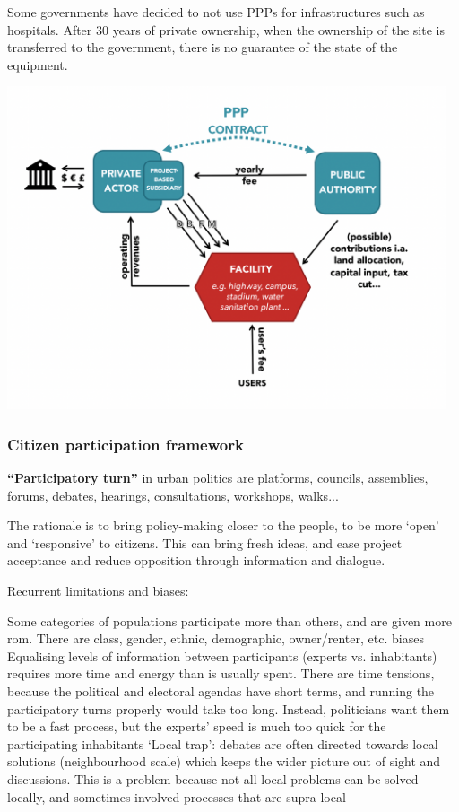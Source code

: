 \documentclass{article}
\begin{document}
Some governments have decided to not use PPPs for infrastructures such as hospitals. After 30 years of private ownership, when the ownership of the site is transferred to the government, there is no guarantee of the state of the equipment.

\begin{center}
\includegraphics[width=35em]{public_private_partnerships}
\end{center}

\subsubsection{Citizen participation framework}

\textbf{``Participatory turn''} in urban politics are platforms, councils, assemblies, forums, debates, hearings, consultations, workshops, walks...

The rationale is to bring policy-making closer to the people, to be more `open' and `responsive' to citizens. This can bring fresh ideas, and ease project acceptance and reduce opposition through information and dialogue.

Recurrent limitations and biases:
\begin{outline}
	\1 Some categories of populations participate more than others, and are given more rom. There are class, gender, ethnic, demographic, owner/renter, etc. biases
	\1 Equalising levels of information between participants (experts vs. inhabitants) requires more time and energy than is usually spent. There are time tensions, because the political and electoral agendas have short terms, and running the participatory turns properly would take too long. Instead, politicians want them to be a fast process, but the experts' speed is much too quick for the participating inhabitants
	\1 `Local trap': debates are often directed towards local solutions (neighbourhood scale) which keeps the wider picture out of sight and discussions. This is a problem because not all local problems can be solved locally, and sometimes involved processes that are supra-local
\end{outline}
\end{document}
